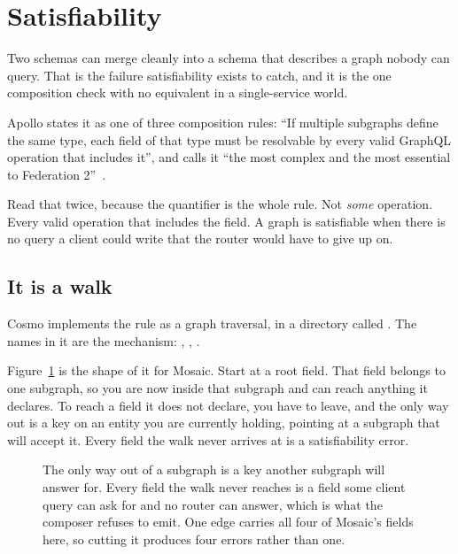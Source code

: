 \section{Satisfiability}
\label{sec:ch09-satisfiability}
%

Two schemas can merge cleanly into a schema that describes a graph nobody can
query. That is the failure satisfiability exists to catch, and it is the one
composition check with no equivalent in a single-service world.

Apollo states it as one of three composition rules: \enquote{If multiple
subgraphs define the same type, each field of that type must be resolvable by
every valid GraphQL operation that includes it}, and calls it \enquote{the most
complex and the most essential to Federation
2}~\autocite{apollo2026compositionrules}.

Read that twice, because the quantifier is the whole rule. Not \emph{some}
operation. Every valid operation that includes the field. A graph is
satisfiable when there is no query a client could write that the router would
have to give up on.

\subsection*{It is a walk}

%
Cosmo implements the rule as a graph traversal, in a directory called
. The names in it are the mechanism:
, , .

Figure~\ref{fig:ch09-resolvability-walk} is the shape of it for Mosaic. Start at
a root field. That field belongs to one subgraph, so you are now inside that
subgraph and can reach anything it declares. To reach a field it does not
declare, you have to leave, and the only way out is a key on an entity you are
currently holding, pointing at a subgraph that will accept it. Every field the
walk never arrives at is a satisfiability error.

\begin{figure}[htbp]
  \centering
  
  \caption{The only way out of a subgraph is a key another subgraph will answer
  for. Every field the walk never reaches is a field some client query can ask
  for and no router can answer, which is what the composer refuses to emit. One
  edge carries all four of Mosaic's fields here, so cutting it produces four
  errors rather than one.}
  \label{fig:ch09-resolvability-walk}
\end{figure}

